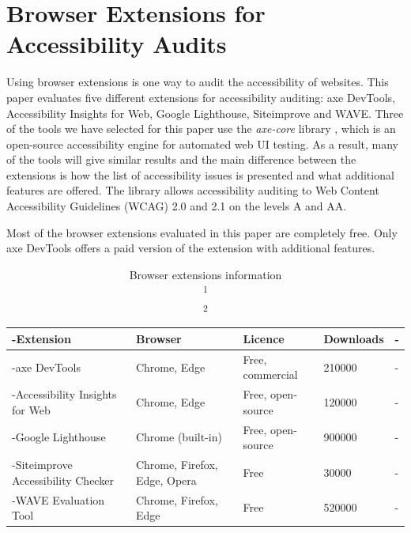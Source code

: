 
\chapter{Browser Extensions for Accessibility Audits}
\label{chap:Intro}

Using browser extensions is one way to audit the accessibility of
websites.  This paper evaluates five different extensions for
accessibility auditing: axe DevTools, Accessibility Insights for Web,
Google Lighthouse, Siteimprove and WAVE.  Three of the tools we have
selected for this paper use the \emph{axe-core} library
\parencite{axe_core}, which is an open-source accessibility engine for
automated web UI testing.  As a result, many of the tools will give
similar results and the main difference between the extensions is how
the list of accessibility issues is presented and what additional
features are offered.  The library allows accessibility auditing to
Web Content Accessibility Guidelines (WCAG) 2.0 and 2.1 on the levels
A and AA.

Most of the browser extensions evaluated in this paper are completely free.
Only axe DevTools offers a paid version of the extension with additional features.

\begin{table}[h]
\tablestretch
{}
\centering
\begin{tabularx}{\linewidth}
{>{\kern-\tabcolsep}lllXX<{\kern-\tabcolsep}}
\toprule
\textbf{Extension} & \textbf{Browser} & \textbf{Licence} & \textbf{Downloads\footnotemark}
\\
\midrule
axe DevTools & Chrome, Edge & Free, commercial & 210000 \\
%
Accessibility Insights for Web & Chrome, Edge & Free, open-source & 120000 \\
%
Google Lighthouse & Chrome (built-in) & Free, open-source & 900000\footnotemark \\
%
Siteimprove Accessibility Checker & Chrome, Firefox, Edge, Opera & Free & 30000 \\
%
WAVE Evaluation Tool & Chrome, Firefox, Edge & Free & 520000 \\
\bottomrule
\end{tabularx}
\caption[Browser Extensions Information]
{
Browser extensions information \\
\textsuperscript{1} \\
\textsuperscript{2}
}
\label{tab:browser-extensions-info}
\end{table}

